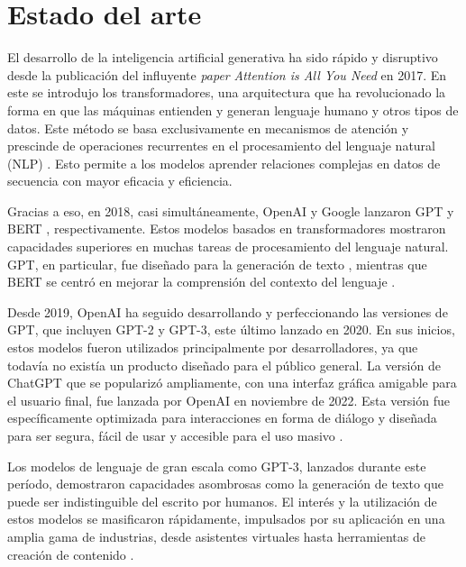 
\section{Estado del arte}

El desarrollo de la inteligencia artificial generativa ha sido rápido y disruptivo desde la publicación del influyente \textit{paper} \textit{Attention is All You Need} \citep{Vaswani2017} en 2017. En este se introdujo los transformadores, una arquitectura que ha revolucionado la forma en que las máquinas entienden y generan lenguaje humano y otros tipos de datos. Este método se basa exclusivamente en mecanismos de atención y prescinde de operaciones recurrentes en el procesamiento del lenguaje natural (NLP) \citep{Vaswani2017}. Esto permite a los modelos aprender relaciones complejas en datos de secuencia con mayor eficacia y eficiencia.

Gracias a eso, en 2018, casi simultáneamente, OpenAI y Google lanzaron GPT \citep{Radford2018} y BERT \citep{Devlin2018}, respectivamente. Estos modelos basados en transformadores mostraron capacidades superiores en muchas tareas de procesamiento del lenguaje natural. GPT, en particular, fue diseñado para la generación de texto \citep{Radford2018}, mientras que BERT se centró en mejorar la comprensión del contexto del lenguaje \citep{Devlin2018}.

Desde 2019, OpenAI ha seguido desarrollando y perfeccionando las versiones de GPT, que incluyen GPT-2 y GPT-3, este último lanzado en 2020. En sus inicios, estos modelos fueron utilizados principalmente por desarrolladores, ya que todavía no existía un producto diseñado para el público general. La versión de ChatGPT que se popularizó ampliamente, con una interfaz gráfica amigable para el usuario final, fue lanzada por OpenAI en noviembre de 2022. Esta versión fue específicamente optimizada para interacciones en forma de diálogo y diseñada para ser segura, fácil de usar y accesible para el uso masivo \citep{OpenAI2022ChatGPT}.

Los modelos de lenguaje de gran escala como GPT-3, lanzados durante este período, demostraron capacidades asombrosas como la generación de texto que puede ser indistinguible del escrito por humanos. El interés y la utilización de estos modelos se masificaron rápidamente, impulsados por su aplicación en una amplia gama de industrias, desde asistentes virtuales hasta herramientas de creación de contenido \citep{V7Labs2023}.

